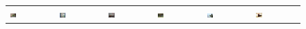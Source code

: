 \begin{figure}[t!]
\begin{tabular}{*{6}{C{0.13\textwidth}}}
  \includegraphics[height=0.12\textwidth,width=0.15\textwidth]{cat_pos_000049.pdf}&
  \includegraphics[height=0.12\textwidth,width=0.15\textwidth]{cat_pos_000146.pdf}&
  \includegraphics[height=0.12\textwidth,width=0.15\textwidth]{cat_neg_000053.pdf}&
  \includegraphics[height=0.12\textwidth,width=0.15\textwidth]{dog_pos_000734.pdf}&
  \includegraphics[height=0.12\textwidth,width=0.15\textwidth]{dog_pos_000258.pdf}&
  \includegraphics[height=0.12\textwidth,width=0.15\textwidth]{dog_neg_000037.pdf}\\[-2ex]
  

\end{tabular}
\end{figure}
